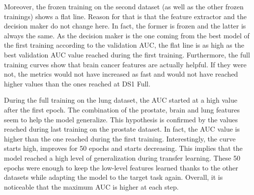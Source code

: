 Moreover, the frozen training on the second dataset (as well as the other frozen trainings) shows a flat line. Reason for that is that the feature extractor and the decision maker do not change here. In fact, the former is frozen and the latter is always the same. As the decision maker is the one coming from the best model of the first training according to the validation AUC, the flat line is as high as the best validation AUC value reached during the first training. Furthermore, the full training curves show that brain cancer features are actually helpful. If they were not, the metrics would not have increased as fast and would not have reached higher values than the ones reached at DS1 Full.

During the full training on the lung dataset, the AUC started at a high value after the first epoch. The combination of the prostate, brain and lung features seem to help the model generalize. This hypothesis is confirmed by the values reached during last training on the prostate dataset. In fact, the AUC value is higher than the one reached during the first training. Interestingly, the curve starts high, improves for 50 epochs and starts decreasing. This implies that the model reached a high level of generalization during transfer learning. These 50 epochs were enough to keep the low-level features learned thanks to the other datasets while adapting the model to the target task again. Overall, it is noticeable that the maximum AUC is higher at each step. 

